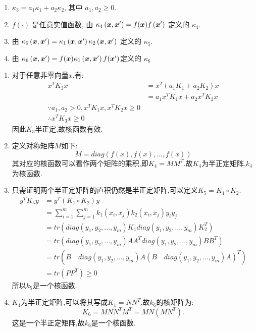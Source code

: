 \documentclass[answers]{exam}  %
\begin{document}
\begin{questions}
    \begin{enumerate}
        \item $\kappa_{3}=a_{1} \kappa_{1}+a_{2} \kappa_{2}$, 其中 $a_{1}, a_{2} \geq 0$.
        \item $f(\cdot)$ 是任意实值函数, 由 $\kappa_{4}\left({\boldsymbol{x}}, {\boldsymbol{x}}^{\prime}\right)=f({\boldsymbol{x}}) f\left({\boldsymbol{x}}^{\prime}\right)$ 定义的 $\kappa_{4}$.
        \item 由 $\kappa_{5}\left({\boldsymbol{x}}, {\boldsymbol{x}}^{\prime}\right)=\kappa_{1}\left({\boldsymbol{x}}, {\boldsymbol{x}}^{\prime}\right) \kappa_{2}\left({\boldsymbol{x}}, {\boldsymbol{x}}^{\prime}\right)$ 定义的 $\kappa_{5}$.
        \item 由 $\kappa_{6}\left({\boldsymbol{x}}, {\boldsymbol{x}}^{\prime}\right)=f({\boldsymbol{x}}) \kappa_{1}\left({\boldsymbol{x}}, {\boldsymbol{x}}^{\prime}\right)f({\boldsymbol{x}}')$定义的 $\kappa_{6}$
    \end{enumerate}
    \begin{solution}
        \begin{enumerate}
            \item 对于任意非零向量$x$,有:
                  \begin{align*}
                      x^TK_3x & =x^T(a_1K_1+a_2K_2)x           \\
                              & =a_1x^TK_1x+a_2x^TK_2x         \\
                      \because a_1,a_2>0,x^TK_1x,x^TK_2x\geq 0 \\
                      \therefore x^TK_3x\geq 0
                  \end{align*}
                  因此$K_3$半正定,故核函数有效.
            \item 定义对称矩阵$M$如下:
                  $$
                      M=diag(f(x),f(x),...,f(x))
                  $$
                  其对应的核函数可以看作两个矩阵的乘积,即$K_4=MM^T$.故$K_4$为半正定矩阵,$k_4$为核函数.
            \item 只需证明两个半正定矩阵的直积仍然是半正定矩阵,可以定义$K_5=K_1\circ K_2$.
                  \begin{align*}
                      y^TK_5y & =y^T(K_1\circ K_2)y                                                  \\
                              & =\sum_{i=1}^{m}\sum_{j=1}^{m}k_1(x_i,x_j)k_2(x_i,x_j)y_iy_j          \\
                              & =tr(diag(y_1,y_2,...,y_m)K_1 diag(y_1,y_2,...,y_m)K_2^T)             \\
                              & =tr(diag(y_1,y_2,...,y_m)AA^T diag(y_1,y_2,...,y_m)BB^T)             \\
                              & =tr(B \quad diag(y_1,y_2,...,y_m)A(B\quad diag(y_1,y_2,...,y_m)A)^T) \\
                              & =tr(PP^T)\geq 0
                  \end{align*}
                  所以$k_5$是一个核函数.
            \item $K_1$为半正定矩阵,可以将其写成$K_1=NN^T$.故$k_6$的核矩阵为:
                  $$
                      K_6=MNN^TM^T=MN(MN^T).
                  $$
                  这是一个半正定矩阵,故$k_6$是一个核函数.
        \end{enumerate}
    \end{solution}


\end{questions}
\end{document}
